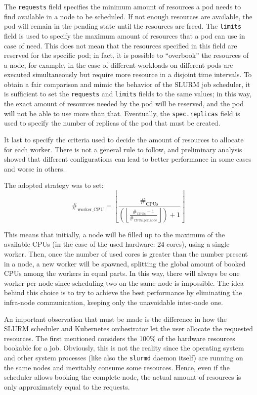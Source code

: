 The \texttt{requests} field specifies the minimum amount of resources a pod
needs to find available in a node to be scheduled. If not enough resources are
available, the pod will remain in the pending state until the resources are
freed.
The \texttt{limits} field is used to specify the maximum amount of resources
that a pod can use in case of need. This does not mean that the resources
specified in this field are reserved for the specific pod; in fact, it is
possible to ``overbook'' the resources of a node, for example, in the case of
different workloads on different pods are executed simultaneously but require
more resource in a disjoint time intervals.
To obtain a fair comparison and mimic the behavior of the SLURM job scheduler,
it is sufficient to set the \texttt{requests} and \texttt{limits} fields to the
same values; in this way, the exact amount of resources needed by the pod will
be reserved, and the pod will not be able to use more than that.
Eventually, the \texttt{spec.replicas} field is used to specify the number of
replicas of the pod that must be created.

It last to specify the criteria used to decide the amount of resources to
allocate for each worker. There is not a general rule to follow, and preliminary
analysis showed that different configurations can lead to better performance in
some cases and worse in others.

The adopted strategy was to set:
$$
\#_{\text{worker\_CPU}} = \left\lfloor \frac{\#_{\text{CPUs}}}{\left( \left\lfloor
    \frac{\#_{\text{CPUs}} - 1}{\#_{\text{CPUs\_per\_node}}} \right\rfloor \right) + 1} \right\rfloor
$$

This means that initially, a node will be filled up to the maximum of the
available CPUs (in the case of the used hardware: 24 cores), using a single
worker.
Then, once the number of used cores is greater than the number present in a
node, a new worker will be spawned, splitting the global amount of booked CPUs
among the workers in equal parts. In this way, there will always be one worker
per node since scheduling two on the same node is impossible.
The idea behind this choice is to try to achieve the best performance by
eliminating the infra-node communication, keeping only the unavoidable
inter-node one.

An important observation that must be made is the difference in how the SLURM
scheduler and Kubernetes orchestrator let the user allocate the requested
resources.
The first mentioned considers the 100\% of the hardware resources bookable for a
job.
Obviously, this is not the reality since the operating system and other system
processes (like also the \texttt{slurmd} daemon itself) are running on the same
nodes and inevitably consume some resources.
Hence, even if the scheduler allows booking the complete node, the actual amount
of resources is only approximately equal to the requests.

